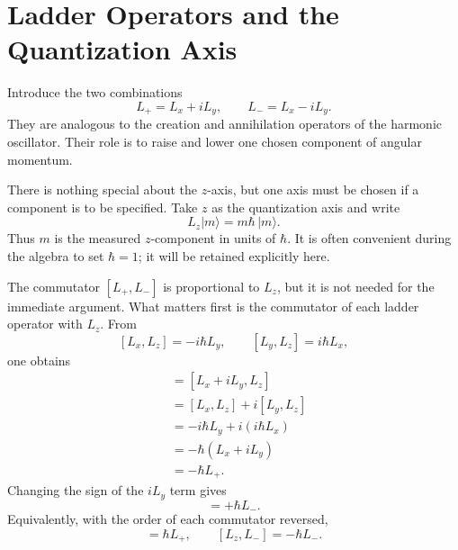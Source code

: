 \begin{classroomqa}
\end{classroomqa}

\section{Ladder Operators and the Quantization Axis}

Introduce the two combinations
\begin{equation}
L_+=L_x+iL_y,
\qquad
L_-=L_x-iL_y.
\end{equation}
They are analogous to the creation and annihilation operators of the harmonic oscillator. Their role is to raise and lower one chosen component of angular momentum.

There is nothing special about the \(z\)-axis, but one axis must be chosen if a component is to be specified. Take \(z\) as the quantization axis and write
\begin{equation}
L_z\lvert m\rangle=m\hbar\,\lvert m\rangle.
\end{equation}
Thus \(m\) is the measured \(z\)-component in units of \(\hbar\). It is often convenient during the algebra to set \(\hbar=1\); it will be retained explicitly here.

The commutator \([L_+,L_-]\) is proportional to \(L_z\), but it is not needed for the immediate argument. What matters first is the commutator of each ladder operator with \(L_z\). From
\[
[L_x,L_z]=-i\hbar L_y,
\qquad
[L_y,L_z]=i\hbar L_x,
\]
one obtains
\begin{align}
[L_+,L_z]
&=[L_x+iL_y,L_z] \\
&=[L_x,L_z]+i[L_y,L_z] \\
&=-i\hbar L_y+i(i\hbar L_x) \\
&=-\hbar(L_x+iL_y) \\
&=-\hbar L_+.
\end{align}
Changing the sign of the \(iL_y\) term gives
\begin{equation}
[L_-,L_z]=+\hbar L_-.
\end{equation}
Equivalently, with the order of each commutator reversed,
\begin{equation}
[L_z,L_+]=\hbar L_+,
\qquad
[L_z,L_-]=-\hbar L_-.
\end{equation}

